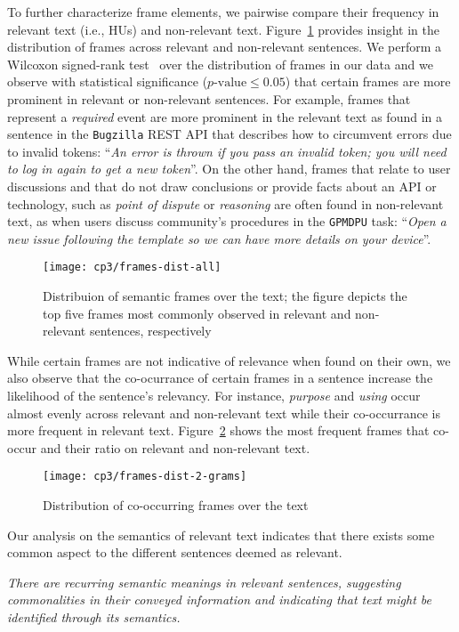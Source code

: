 To further characterize  frame elements, 
we pairwise compare their frequency in relevant text (i.e., HUs) and non-relevant text.
Figure~\ref{fig:frame-distribution} provides insight in the distribution of frames across relevant and non-relevant sentences.
We perform a Wilcoxon signed-rank test~\cite{wohlin2012} over the distribution of frames in our data and we observe with statistical significance ($p\text{-value} \le 0.05$) 
that certain frames are more prominent in relevant or non-relevant sentences.
For example, frames that represent a \textit{required} event
are more prominent in the relevant text
as found in a sentence in the \texttt{Bugzilla} REST API that describes
how to circumvent errors due to invalid tokens:
``\textit{An error is thrown if you pass an invalid token; you will need to log in again to get a new token}''.
On the other hand, frames that relate to user discussions and that do not draw conclusions or provide 
facts about an API or technology, such as \textit{point of dispute} or \textit{reasoning} are often found in non-relevant text,
as when users discuss community's procedures in the \texttt{GPMDPU} task: ``\textit{Open a new issue following the template so we can have more details on your device}''. 




\begin{figure}
\centering
\texttt{[image: cp3/frames-dist-all]}
\caption{Distribuion of semantic frames over the text; the figure depicts the top five frames most commonly observed in relevant and non-relevant sentences, respectively}
\label{fig:frame-distribution}
\end{figure}


While certain frames are not indicative of relevance when found on their own, we also observe that the co-ocurrance of certain frames in a sentence increase the likelihood of the sentence's relevancy.
For instance, \textit{purpose} and \textit{using} occur almost evenly across relevant and non-relevant text
while their co-occurrance is more frequent in relevant text. 
Figure~\ref{fig:frame-co-occurrence} shows the most frequent frames that co-occur and their ratio on relevant and non-relevant text.



\begin{figure}
\centering
\texttt{[image: cp3/frames-dist-2-grams]}
\caption{Distribution of co-occurring frames over the text}
\label{fig:frame-co-occurrence}
\end{figure}


Our analysis on the semantics of relevant text indicates that there exists some common aspect to the different sentences deemed as relevant.


\medskip
\begin{bluequote}
    \textit{There are recurring semantic meanings in relevant sentences,
    suggesting commonalities in their conveyed information
    and indicating that text might be identified through its semantics.}
\end{bluequote}
